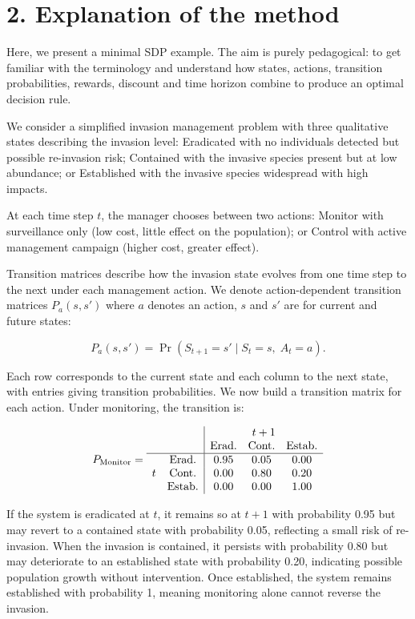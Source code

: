 \documentclass[
  11pt,
  a4paper,
]{article}
\begin{document}
\section{2. Explanation of the method}\label{explanation-of-the-method}

Here, we present a minimal SDP example. The aim is purely pedagogical: to get familiar with the terminology and understand how states, actions, transition probabilities, rewards, discount and time horizon combine to produce an optimal decision rule.

We consider a simplified invasion management problem with three qualitative states describing the invasion level: Eradicated with no individuals detected but possible re-invasion risk; Contained with the invasive species present but at low abundance; or Established with the invasive species widespread with high impacts.

At each time step \(t\), the manager chooses between two actions: Monitor with surveillance only (low cost, little effect on the population); or Control with active management campaign (higher cost, greater effect).

Transition matrices describe how the invasion state evolves from one time step to the next under each management action. We denote action-dependent transition matrices \(P_a(s,s')\) where \(a\) denotes an action, \(s\) and \(s'\) are for current and future states:

\[
P_a(s,s') = \Pr(S_{t+1}=s' \mid S_t=s,\; A_t=a).
\]

Each row corresponds to the current state and each column to the next state, with entries giving transition probabilities. We now build a transition matrix for each action. Under monitoring, the transition is:

\[
P_{\text{Monitor}} =
\begin{array}{cc|ccc}
& & \multicolumn{3}{c}{t+1} \\
& & \text{Erad.} & \text{Cont.} & \text{Estab.} \\
\hline
\multirow{3}{*}{$t$} 
& \text{Erad.}  & 0.95 & 0.05 & 0.00 \\
& \text{Cont.}  & 0.00 & 0.80 & 0.20 \\
& \text{Estab.} & 0.00 & 0.00 & 1.00 \\
\end{array}
\]

If the system is eradicated at \(t\), it remains so at \(t+1\) with probability 0.95 but may revert to a contained state with probability 0.05, reflecting a small risk of re-invasion. When the invasion is contained, it persists with probability 0.80 but may deteriorate to an established state with probability 0.20, indicating possible population growth without intervention. Once established, the system remains established with probability 1, meaning monitoring alone cannot reverse the invasion.
\end{document}
